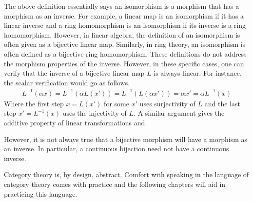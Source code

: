 \documentclass[../sean_thesis.tex]{subfiles}
\begin{document}
The above definition essentially says an isomorphism is a morphism that has a morphism as an inverse. For example, a linear map is an isomorphism if it has a linear inverse and a ring homomorphism is an isomorphism if its inverse is a ring homomorphism. However, in linear algebra, the definition of an isomorphism is often given as a bijective linear map. Similarly, in ring theory, an isomorphism is often defined as a bijective ring homomorphism. These definitions do not address the morphism properties of the inverse. However, in these specific cases, one can verify that the inverse of a bijective linear map $L$ is always linear. For instance, the scalar verification would go as follows.
\begin{align*}
	L^{-1}(\alpha x) 
	= L^{-1}(\alpha L(x')) 
	= L^{-1}(L(\alpha x'))
	= \alpha x'
	= \alpha L^{-1}(x)
\end{align*}
Where the first step $x = L(x')$ for some $x'$ uses surjectivity of $L$ and the last step $x' = L^{-1}(x)$ uses the injectivity of $L$. A similar argument gives the additive property of linear transformations and 

However, it is not always true that a bijective morphism will have a morphism as an inverse. In particular, a continuous bijection need not have a continuous inverse.

Category theory is, by design, abstract. Comfort with speaking in the language of category theory comes with practice and the following chapters will aid in practicing this language.
\end{document}
